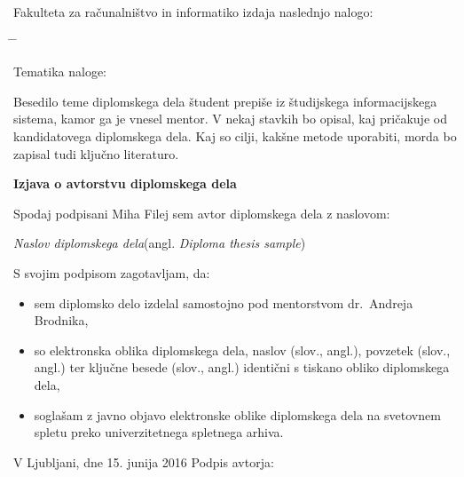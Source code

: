 \documentclass[a4paper, 12pt]{book}
\newcommand{\ttitle}{Naslov diplomskega dela}
\newcommand{\ttitleEn}{Diploma thesis sample}
\newcommand{\tauthor}{Miha Filej}
\newcommand{\clearemptydoublepage}{\newpage{\pagestyle{empty}\cleardoublepage}}
\begin{document}
\noindent
Fakulteta za računalništvo in informatiko izdaja naslednjo nalogo:
\medskip
\begin{tabbing}
\hspace{32mm}\= \hspace{6cm} \= \kill




Tematika naloge:
\end{tabbing}
Besedilo teme diplomskega dela študent prepiše iz študijskega informacijskega sistema, kamor ga je vnesel mentor. V nekaj stavkih bo opisal, kaj pričakuje od kandidatovega diplomskega dela. Kaj so cilji, kakšne metode uporabiti, morda bo zapisal tudi ključno literaturo.
\vspace{15mm}






\vspace{2cm}

\clearemptydoublepage

\vspace*{1cm}
\begin{center}
{\Large \textbf{\sc Izjava o avtorstvu diplomskega dela}}
\end{center}

\vspace{1cm}
\noindent Spodaj podpisani \tauthor{} sem avtor diplomskega dela z naslovom:

\vspace{0.5cm}
\emph{\ttitle}\hspace{5mm}(angl. \emph{\ttitleEn})

\vspace{1.5cm}
\noindent S svojim podpisom zagotavljam, da:
\begin{itemize}
  \item sem diplomsko delo izdelal samostojno pod mentorstvom dr.\ Andreja Brodnika,
  \item so elektronska oblika diplomskega dela, naslov (slov., angl.), povzetek (slov., angl.) ter ključne besede (slov., angl.) identični s tiskano obliko diplomskega dela,
  \item soglašam z javno objavo elektronske oblike diplomskega dela na svetovnem spletu preko univerzitetnega spletnega arhiva.	
\end{itemize}

\vspace{1cm}
\noindent V Ljubljani, dne 15. junija 2016 \hfill Podpis avtorja:
\end{document}
